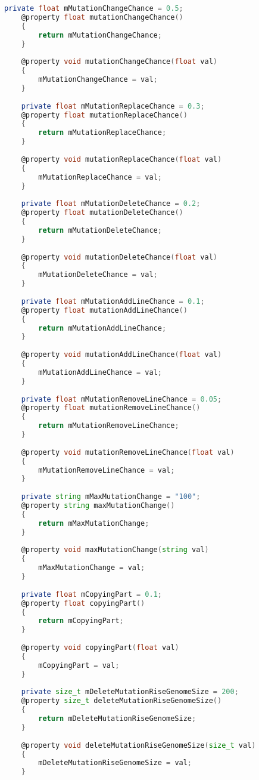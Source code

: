 \documentclass[russian,utf8,emptystyle]{eskdtext}
\begin{document}
\begin{lstlisting}[language=D]
    private float mMutationChangeChance = 0.5;
    @property float mutationChangeChance()
    {
        return mMutationChangeChance;
    }
    
    @property void mutationChangeChance(float val)
    {
        mMutationChangeChance = val;
    }
    
    private float mMutationReplaceChance = 0.3;
    @property float mutationReplaceChance()
    {
        return mMutationReplaceChance;
    }
    
    @property void mutationReplaceChance(float val)
    {
        mMutationReplaceChance = val;
    }
    
    private float mMutationDeleteChance = 0.2;
    @property float mutationDeleteChance()
    {
        return mMutationDeleteChance;
    }
    
    @property void mutationDeleteChance(float val)
    {
        mMutationDeleteChance = val;
    }
    
    private float mMutationAddLineChance = 0.1;
    @property float mutationAddLineChance()
    {
        return mMutationAddLineChance;
    }
    
    @property void mutationAddLineChance(float val)
    {
        mMutationAddLineChance = val;
    }
    
    private float mMutationRemoveLineChance = 0.05;
    @property float mutationRemoveLineChance()
    {
        return mMutationRemoveLineChance;
    }
    
    @property void mutationRemoveLineChance(float val)
    {
        mMutationRemoveLineChance = val;
    }
    
    private string mMaxMutationChange = "100";
    @property string maxMutationChange()
    {
        return mMaxMutationChange;
    }
    
    @property void maxMutationChange(string val)
    {
        mMaxMutationChange = val;
    }
    
    private float mCopyingPart = 0.1;
    @property float copyingPart()
    {
        return mCopyingPart;
    }
    
    @property void copyingPart(float val)
    {
        mCopyingPart = val;
    }
    
    private size_t mDeleteMutationRiseGenomeSize = 200;
    @property size_t deleteMutationRiseGenomeSize()
    {
        return mDeleteMutationRiseGenomeSize;
    }
    
    @property void deleteMutationRiseGenomeSize(size_t val)
    {
        mDeleteMutationRiseGenomeSize = val;
    }
    

\end{lstlisting}
\end{document}
